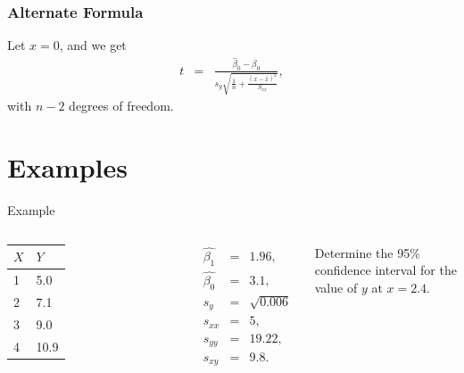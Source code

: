 \begin{frame}
  \frametitle{Alternate Formula}

  Let $x=0$, and we get 
  \begin{eqnarray*}
    t & = & \frac{\hat{\beta}_0 - \beta_0}{
        s_y\sqrt{\frac{1}{n}+\frac{(x-\bar{x})^2}{S_{xx}}}},
  \end{eqnarray*}
  with $n-2$ degrees of freedom.
  
\end{frame}

\section{Examples}

\begin{frame}{Example}

    \begin{columns}

      \begin{tabular}{l|l}
        $X$ & $Y$ \\ \hline
        1 & 5.0 \\
        2 & 7.1 \\
        3 & 9.0 \\
        4 & 10.9 \\
      \end{tabular}


      \begin{eqnarray*}
        \hat{\beta_1} & = & 1.96, \\
        \hat{\beta_0} & = & 3.1, \\
        s_y & = & \sqrt{0.006} \\
        s_{xx} & = & 5, \\
        s_{yy} & = & 19.22, \\
        s_{xy} & = & 9.8. 
      \end{eqnarray*}



      Determine the 95\% confidence interval for the value of $y$ at $x=2.4$.

    \end{columns}



\end{frame}


